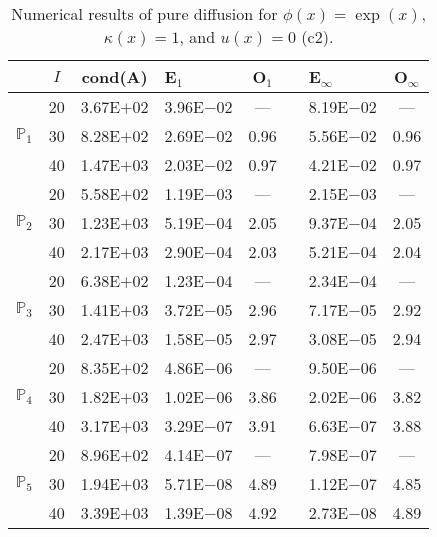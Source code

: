 \begin{table}[H]
\centering
\caption{Numerical results of pure diffusion for $\phi(x)=\exp(x)$, $\kappa(x)=1$, and $u(x)=0$ (c2).}
\begin{tabular}{@{}l c c l c c l c@{}}
\toprule
 & $I$ & cond(A) & E$_1$ & O$_1$ && E$_{\infty}$ & O$_{\infty}$\\
\midrule
\multirow{3}{*}{$\mathbb{P}_{1}$}
 & 20 & 3.67E$+$02 & 3.96E$-$02 & --- && 8.19E$-$02 & ---\\
 & 30 & 8.28E$+$02 & 2.69E$-$02 & 0.96 && 5.56E$-$02 & 0.96\\
 & 40 & 1.47E$+$03 & 2.03E$-$02 & 0.97 && 4.21E$-$02 & 0.97\\
\midrule
\multirow{3}{*}{$\mathbb{P}_{2}$}
 & 20 & 5.58E$+$02 & 1.19E$-$03 & --- && 2.15E$-$03 & ---\\
 & 30 & 1.23E$+$03 & 5.19E$-$04 & 2.05 && 9.37E$-$04 & 2.05\\
 & 40 & 2.17E$+$03 & 2.90E$-$04 & 2.03 && 5.21E$-$04 & 2.04\\
\midrule
\multirow{3}{*}{$\mathbb{P}_{3}$}
 & 20 & 6.38E$+$02 & 1.23E$-$04 & --- && 2.34E$-$04 & ---\\
 & 30 & 1.41E$+$03 & 3.72E$-$05 & 2.96 && 7.17E$-$05 & 2.92\\
 & 40 & 2.47E$+$03 & 1.58E$-$05 & 2.97 && 3.08E$-$05 & 2.94\\
\midrule
\multirow{3}{*}{$\mathbb{P}_{4}$}
 & 20 & 8.35E$+$02 & 4.86E$-$06 & --- && 9.50E$-$06 & ---\\
 & 30 & 1.82E$+$03 & 1.02E$-$06 & 3.86 && 2.02E$-$06 & 3.82\\
 & 40 & 3.17E$+$03 & 3.29E$-$07 & 3.91 && 6.63E$-$07 & 3.88\\
\midrule
\multirow{3}{*}{$\mathbb{P}_{5}$}
 & 20 & 8.96E$+$02 & 4.14E$-$07 & --- && 7.98E$-$07 & ---\\
 & 30 & 1.94E$+$03 & 5.71E$-$08 & 4.89 && 1.12E$-$07 & 4.85\\
 & 40 & 3.39E$+$03 & 1.39E$-$08 & 4.92 && 2.73E$-$08 & 4.89\\
\bottomrule
\end{tabular}
\end{table}